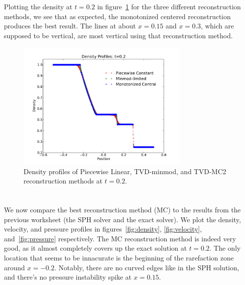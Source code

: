 \documentclass[11pt,letterpaper]{article}
\begin{document}
\section{}

Plotting the density at $t=0.2$ in figure~\ref{fig:recon_density} for the three 
different reconstruction methods, we
see that as expected, the monotonized centered reconstruction produces the best result. 
The lines at about $x=0.15$ and $x=0.3$, which are supposed to be vertical, are most 
vertical using that reconstruction method.

\begin{figure}[bth]
\centering
\includegraphics[width=0.75\textwidth]{reconstruction_densities.pdf}
\caption{Density profiles of Piecewise Linear, TVD-minmod,
         and TVD-MC2 reconstruction methods at $t=0.2$.}
\label{fig:recon_density}
\end{figure}



\section{}

We now compare the best reconstruction method (MC) to the results from the previous
worksheet (the SPH solver and the exact solver). We plot the density, velocity, and 
pressure profiles in figures~\ref{fig:density}, \ref{fig:velocity}, and~\ref{fig:pressure}
respectively. The MC reconstruction method is indeed very good, as it almost completely 
covers up the exact solution at $t=0.2$. The only location that seems to be innacurate
is the beginning of the rarefaction zone around $x=-0.2$. Notably, there are no
curved edges like in the SPH solution, and there's no pressure instability spike at
$x=0.15$.  
\end{document}

